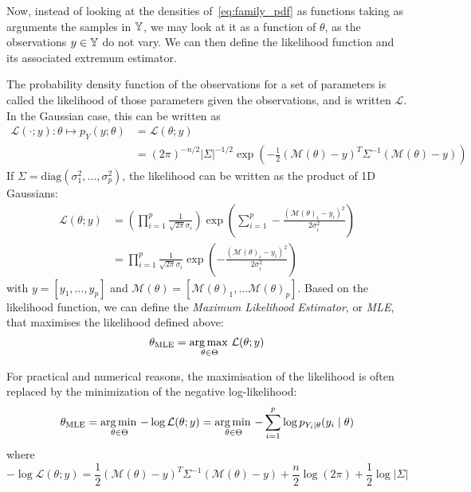 \documentclass[../../Main_ManuscritThese.tex]{subfiles}
\begin{document}
Now, instead of looking at the densities of~\cref{eq:family_pdf} as
functions taking as arguments the samples in $\mathbb{Y}$, we may look at
it as a function of $\theta$, as the observations $y\in\mathbb{Y}$ do not
vary. We can then define the likelihood function and its associated
extremum estimator.
\begin{definition}
  \label{def:mle}
  The probability density function of the observations for a set of
  parameters is called the likelihood of those parameters given the
  observations, and is written $\mathcal{L}$. In the Gaussian case,
  this can be written as
  \begin{align}
    \label{eq:likelihood_definition}
    \mathcal{L}(\cdot ;y): \theta \mapsto p_{Y}(y;\theta) &= \mathcal{L}(\theta;y) \\
    &=(2\pi)^{-n/2}\lvert \Sigma \rvert^{-1/2}\exp\left(-\frac{1}{2}(\mathcal{M}(\theta) - y)^T\Sigma^{-1}(\mathcal{M}(\theta) - y)\right)
  \end{align}
  If $\Sigma = \mathrm{diag}(\sigma^2_1,\dots, \sigma^2_p)$, the likelihood can be written as the product of 1D Gaussians: 
  \begin{align}
    \mathcal{L}(\theta;y) &= \left(\prod_{i=1}^p\frac{1}{\sqrt{2\pi}\sigma_i}\right)\exp\left(\sum_{i=1}^p -\frac{(\mathcal{M}(\theta)_i - y_i)^2}{2\sigma^2_i}\right) \\
                          &= \prod_{i=1}^p\frac{1}{\sqrt{2\pi}\sigma_i}\exp\left(-\frac{(\mathcal{M}(\theta)_i - y_i)^2}{2\sigma^2_i}\right)
  \end{align}
  with $y = [y_1, \dots, y_p]$ and $\mathcal{M}(\theta) = [\mathcal{M}(\theta)_1,\dots \mathcal{M}(\theta)_p]$.
  Based on the likelihood function, we can define the \emph{Maximum Likelihood Estimator}, or \emph{MLE}, that maximises the likelihood defined above:
  \begin{equation}
    \label{eq:def_MLE}
    {\theta}_{\mathrm{MLE}} = \operatorname*{arg\,max \,}_{\theta\in\Theta}\mathcal{L}(\theta;y)
  \end{equation}

\end{definition}
  For practical and numerical reasons, the maximisation of the likelihood is often replaced by the minimization of the negative log-likelihood:
  \begin{equation}
    \label{eq:MLE_iid}
    {\theta}_{\mathrm{MLE}} = \operatorname*{arg\,min \,}_{\theta \in \Theta} -\log \mathcal{L}(\theta;y)= \operatorname*{arg\,min \,}_{\theta \in \Theta} -\sum_{i=1}^p\log p_{Y_i\mid \theta}(y_i \mid \theta) 
  \end{equation} 
  where
  \begin{equation}
    -\log\mathcal{L}(\theta;y) = \frac{1}{2}(\mathcal{M}(\theta) - y)^T\Sigma^{-1}(\mathcal{M}(\theta) - y)+  \frac{n}{2}\log(2\pi) + \frac{1}{2}\log\lvert \Sigma \rvert
  \end{equation}
\end{document}
